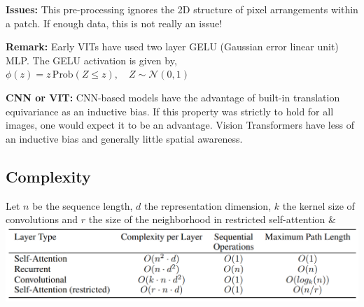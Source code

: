 \textbf{Issues:} This pre-processing ignores the 2D structure of pixel arrangements within a patch. If enough data, this is not really an issue!


\textbf{Remark:} Early VITs have used two layer GELU (Gaussian error linear unit) MLP. The GELU activation is given by, $\phi(z) = z \, \text{Prob}(Z \leq z), \quad Z \sim \mathcal{N}(0, 1)$


\textbf{CNN or VIT:} CNN-based models have the advantage of built-in translation equivariance as an inductive bias. If this property was strictly to hold for all images, one would expect it to be an
advantage. Vision Transformers have less of an inductive bias and generally little spatial awareness.

\subsection{Complexity}
Let \(n\) be the sequence length, \(d\) the representation dimension, \(k\) the kernel size of convolutions and \(r\) the size of the neighborhood in restricted self-attention
&\includegraphics[width=\linewidth]{contents/imgs/transformer_complexity.png}







